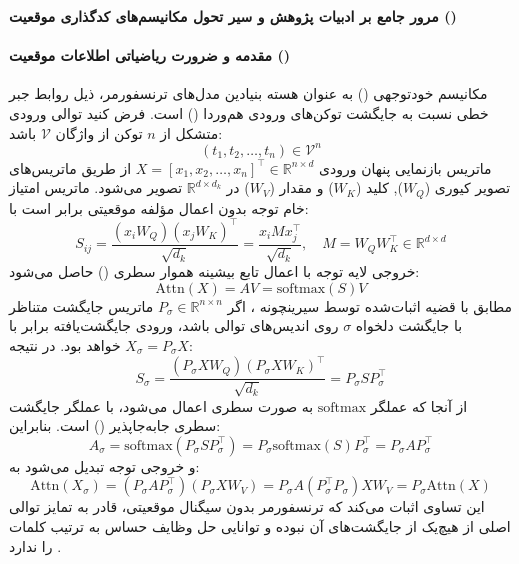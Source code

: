 \item \textbf{مرور جامع بر ادبیات پژوهش و سیر تحول مکانیسم‌های کدگذاری موقعیت ()}

\paragraph*{مقدمه و ضرورت ریاضیاتی اطلاعات موقعیت ()}
مکانیسم خودتوجهی () به عنوان هسته بنیادین مدل‌های ترنسفورمر، ذیل روابط جبر خطی نسبت به جایگشت توکن‌های ورودی هم‌وردا () است. فرض کنید توالی ورودی متشکل از $n$ توکن از واژگان $\mathcal{V}$ باشد:
\begin{equation}
    (t_1, t_2, \dots, t_n) \in \mathcal{V}^n
\end{equation}
ماتریس بازنمایی پنهان ورودی $X = [x_1, x_2, \dots, x_n]^\top \in \mathbb{R}^{n \times d}$ از طریق ماتریس‌های تصویر کیوری ($W_Q$), کلید ($W_K$) و مقدار ($W_V$) در $\mathbb{R}^{d \times d_k}$ تصویر می‌شود. ماتریس امتیاز خام توجه بدون اعمال مؤلفه موقعیتی برابر است با:
\begin{equation}
    S_{ij} = \frac{(x_i W_Q)(x_j W_K)^\top}{\sqrt{d_k}} = \frac{x_i M x_j^\top}{\sqrt{d_k}}, \quad M = W_Q W_K^\top \in \mathbb{R}^{d \times d}
\end{equation}
خروجی لایه توجه با اعمال تابع بیشینه هموار سطری () حاصل می‌شود:
\begin{equation}
    \text{Attn}(X) = A V = \text{softmax}(S) V
\end{equation}
مطابق با قضیه اثبات‌شده توسط سیرینچونه \cite{cirrincione2026geometry}، اگر $P_\sigma \in \mathbb{R}^{n \times n}$ ماتریس جایگشت متناظر با جایگشت دلخواه $\sigma$ روی اندیس‌های توالی باشد، ورودی جایگشت‌یافته برابر با $X_\sigma = P_\sigma X$ خواهد بود. در نتیجه:
\begin{equation}
    S_\sigma = \frac{(P_\sigma X W_Q)(P_\sigma X W_K)^\top}{\sqrt{d_k}} = P_\sigma S P_\sigma^\top
\end{equation}
از آنجا که عملگر $\text{softmax}$ به صورت سطری اعمال می‌شود، با عملگر جایگشت سطری جابه‌جاپذیر () است. بنابراین:
\begin{equation}
    A_\sigma = \text{softmax}(P_\sigma S P_\sigma^\top) = P_\sigma \text{softmax}(S) P_\sigma^\top = P_\sigma A P_\sigma^\top
\end{equation}
و خروجی توجه تبدیل می‌شود به:
\begin{equation}
    \text{Attn}(X_\sigma) = (P_\sigma A P_\sigma^\top)(P_\sigma X W_V) = P_\sigma A (P_\sigma^\top P_\sigma) X W_V = P_\sigma \text{Attn}(X)
\end{equation}
این تساوی اثبات می‌کند که ترنسفورمر بدون سیگنال موقعیتی، قادر به تمایز توالی اصلی از هیچ‌یک از جایگشت‌های آن نبوده و توانایی حل وظایف حساس به ترتیب کلمات را ندارد \cite{cirrincione2026geometry, jiguo2026position}.

